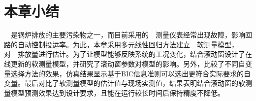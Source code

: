 \section{本章小结}
~~是锅炉排放的主要污染物之一，而目前采用的~~测量仪表经常出现故障，影响回路的自动控制投运率。为此，本章采用多元线性回归方法建立~~软测量模型，对~~排放量进行估计。为了让模型能够反映系统的工况变化，结合滚动窗设计了在线更新的软测量模型，并研究了滚动窗参数对模型的影响。另外，比较了不同自变量选择方法的效果，仿真结果显示基于BIC信息准则可以选出更符合实际要求的自变量。最后对比了软测量模型的估计值与现场实测值，结果表明结合滚动窗的软测量模型预测效果达到设计要求，且能在运行较长时间后保持精度不降低。

